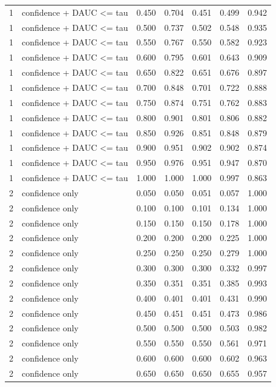 \begin{tabular}{rlrrrrr}
1 & confidence + DAUC <= tau & 0.450 & 0.704 & 0.451 & 0.499 & 0.942 \\
1 & confidence + DAUC <= tau & 0.500 & 0.737 & 0.502 & 0.548 & 0.935 \\
1 & confidence + DAUC <= tau & 0.550 & 0.767 & 0.550 & 0.582 & 0.923 \\
1 & confidence + DAUC <= tau & 0.600 & 0.795 & 0.601 & 0.643 & 0.909 \\
1 & confidence + DAUC <= tau & 0.650 & 0.822 & 0.651 & 0.676 & 0.897 \\
1 & confidence + DAUC <= tau & 0.700 & 0.848 & 0.701 & 0.722 & 0.888 \\
1 & confidence + DAUC <= tau & 0.750 & 0.874 & 0.751 & 0.762 & 0.883 \\
1 & confidence + DAUC <= tau & 0.800 & 0.901 & 0.801 & 0.806 & 0.882 \\
1 & confidence + DAUC <= tau & 0.850 & 0.926 & 0.851 & 0.848 & 0.879 \\
1 & confidence + DAUC <= tau & 0.900 & 0.951 & 0.902 & 0.902 & 0.874 \\
1 & confidence + DAUC <= tau & 0.950 & 0.976 & 0.951 & 0.947 & 0.870 \\
1 & confidence + DAUC <= tau & 1.000 & 1.000 & 1.000 & 0.997 & 0.863 \\
2 & confidence only & 0.050 & 0.050 & 0.051 & 0.057 & 1.000 \\
2 & confidence only & 0.100 & 0.100 & 0.101 & 0.134 & 1.000 \\
2 & confidence only & 0.150 & 0.150 & 0.150 & 0.178 & 1.000 \\
2 & confidence only & 0.200 & 0.200 & 0.200 & 0.225 & 1.000 \\
2 & confidence only & 0.250 & 0.250 & 0.250 & 0.279 & 1.000 \\
2 & confidence only & 0.300 & 0.300 & 0.300 & 0.332 & 0.997 \\
2 & confidence only & 0.350 & 0.351 & 0.351 & 0.385 & 0.993 \\
2 & confidence only & 0.400 & 0.401 & 0.401 & 0.431 & 0.990 \\
2 & confidence only & 0.450 & 0.451 & 0.451 & 0.473 & 0.986 \\
2 & confidence only & 0.500 & 0.500 & 0.500 & 0.503 & 0.982 \\
2 & confidence only & 0.550 & 0.550 & 0.550 & 0.561 & 0.971 \\
2 & confidence only & 0.600 & 0.600 & 0.600 & 0.602 & 0.963 \\
2 & confidence only & 0.650 & 0.650 & 0.650 & 0.655 & 0.957 \\

\end{tabular}
